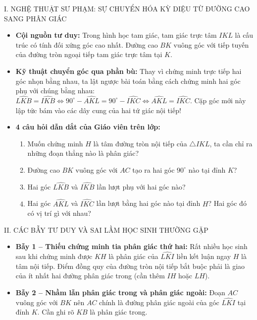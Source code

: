 \documentclass[11pt,a4paper]{article}
\begin{document}
\vspace{1mm}

\begin{pedagogybox}{I. NGHỆ THUẬT SƯ PHẠM: SỰ CHUYỂN HÓA KỲ DIỆU TỪ ĐƯỜNG CAO SANG PHÂN GIÁC}
\begin{itemize}[leftmargin=*]
    \item \textbf{Cội nguồn tư duy:} Trong hình học tam giác, tam giác trực tâm $IKL$ là cấu trúc có tính đối xứng góc cao nhất. Đường cao $BK$ vuông góc với tiếp tuyến của đường tròn ngoại tiếp tam giác trực tâm tại $K$.
    \item \textbf{Kỹ thuật chuyển góc qua phần bù:} Thay vì chứng minh trực tiếp hai góc nhọn bằng nhau, ta lật ngược bài toán bằng cách chứng minh hai góc phụ với chúng bằng nhau: $\widehat{LKB} = \widehat{IKB} \iff 90^\circ - \widehat{AKL} = 90^\circ - \widehat{IKC} \iff \widehat{AKL} = \widehat{IKC}$. Cặp góc mới này lập tức bám vào các dây cung của hai tứ giác nội tiếp!
    \item \textbf{4 câu hỏi dẫn dắt của Giáo viên trên lớp:}
    \begin{enumerate}[label=\arabic*., nosep]
        \item Muốn chứng minh $H$ là tâm đường tròn nội tiếp của $\triangle IKL$, ta cần chỉ ra những đoạn thẳng nào là phân giác?
        \item Đường cao $BK$ vuông góc với $AC$ tạo ra hai góc $90^\circ$ nào tại đỉnh $K$?
        \item Hai góc $\widehat{LKB}$ và $\widehat{IKB}$ lần lượt phụ với hai góc nào?
        \item Hai góc $\widehat{AKL}$ và $\widehat{IKC}$ lần lượt bằng hai góc nào tại đỉnh $H$? Hai góc đó có vị trí gì với nhau?
    \end{enumerate}
\end{itemize}
\end{pedagogybox}

\vspace{1mm}

\begin{pedagogybox}{II. CÁC BẪY TƯ DUY VÀ SAI LẦM HỌC SINH THƯỜNG GẶP}
\begin{itemize}[leftmargin=*, nosep]
    \item \textbf{Bẫy 1 -- Thiếu chứng minh tia phân giác thứ hai:} Rất nhiều học sinh sau khi chứng minh được $KH$ là phân giác của $\widehat{LKI}$ liền kết luận ngay $H$ là tâm nội tiếp. Điểm đồng quy của đường tròn nội tiếp bắt buộc phải là giao của ít nhất hai đường phân giác trong (cần thêm $IH$ hoặc $LH$).
    \item \textbf{Bẫy 2 -- Nhầm lẫn phân giác trong và phân giác ngoài:} Đoạn $AC$ vuông góc với $BK$ nên $AC$ chính là đường phân giác ngoài của góc $\widehat{LKI}$ tại đỉnh $K$. Cần ghi rõ $KB$ là phân giác trong.
\end{itemize}
\end{pedagogybox}
\end{document}
